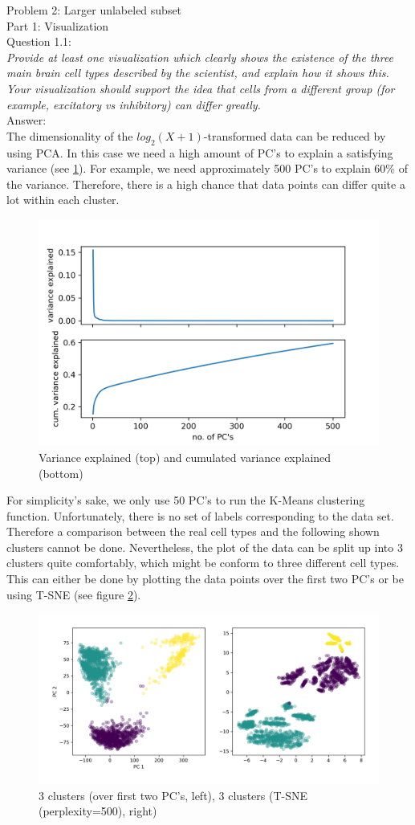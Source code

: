 Problem 2: Larger unlabeled subset\\
Part 1: Visualization\\
Question 1.1:\\
\textsl{Provide at least one visualization which clearly shows the existence of the three main brain cell types described by the scientist, and explain how it shows this. Your visualization should support the idea that cells from a different group (for example, excitatory vs inhibitory) can differ greatly.}\\

Answer:\\
The dimensionality of the $log_2(X+1)$-transformed data can be reduced by using PCA. In this case we need a high amount of PC's to explain a satisfying variance (see \ref{fig:pcaanalysis}). For example, we need approximately 500 PC's to explain $60\%$ of the variance. Therefore, there is a high chance that data points can differ quite a lot within each cluster.

\begin{figure}[h]
	\centering
	\includegraphics[width=0.6\linewidth]{problem_02/PCA_analysis}
	\caption{Variance explained (top) and cumulated variance explained (bottom)}
	\label{fig:pcaanalysis}
\end{figure}

For simplicity's sake, we only use 50 PC's to run the K-Means clustering function. Unfortunately, there is no set of labels corresponding to the data set. Therefore a comparison between the real cell types and the following shown clusters cannot be done. Nevertheless, the plot of the data can be split up into 3 clusters quite comfortably, which might be conform to three different cell types. This can either be done by plotting the data points over the first two PC's or be using T-SNE (see figure \ref{fig:clusters}).

\begin{figure}[h]
	\centering
	\includegraphics[width=0.9\linewidth]{problem_02/clusters}
	\caption{3 clusters (over first two PC's, left), 3 clusters (T-SNE (perplexity=500), right)}
	\label{fig:clusters}
\end{figure}